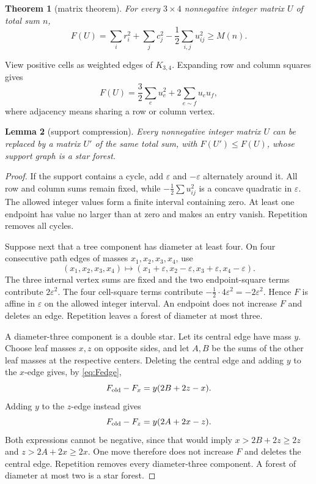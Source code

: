 \documentclass[11pt]{article}
\theoremstyle{plain}
\newtheorem{theorem}{Theorem}[section]
\newtheorem{lemma}[theorem]{Lemma}
\theoremstyle{definition}
\theoremstyle{remark}
\newcommand{\1}{\mathbf 1}
\newcommand{\eps}{\varepsilon}
\begin{document}
\begin{theorem}[matrix theorem]\label{thm:matrix}
For every $3\times4$ nonnegative integer matrix $U$ of total sum $n$,
\begin{equation}\label{eq:matrix}
 F(U)=\sum_i r_i^2+\sum_jc_j^2-\frac12\sum_{i,j}u_{ij}^2\geq M(n).
\end{equation}
\end{theorem}

View positive cells as weighted edges of $K_{3,4}$.  Expanding row and column
squares gives
\begin{equation}\label{eq:Fedge}
 F(U)=\frac32\sum_eu_e^2+2\sum_{e\sim f}u_eu_f,
\end{equation}
where adjacency means sharing a row or column vertex.

\begin{lemma}[support compression]\label{lem:compression}
Every nonnegative integer matrix $U$ can be replaced by a matrix $U'$ of the
same total sum, with $F(U')\leq F(U)$, whose support graph is a star forest.
\end{lemma}

\begin{proof}
If the support contains a cycle, add $\eps$ and $-\eps$ alternately around it.
All row and column sums remain fixed, while
$-\frac12\sum u_{ij}^2$ is a concave quadratic in $\eps$.  The allowed
integer values form a finite interval containing zero.  At least one endpoint
has value no larger than at zero and makes an entry vanish.  Repetition removes
all cycles.

Suppose next that a tree component has diameter at least four.  On four
consecutive path edges of masses $x_1,x_2,x_3,x_4$, use
\[
 (x_1,x_2,x_3,x_4)\mapsto
 (x_1+\eps,x_2-\eps,x_3+\eps,x_4-\eps).
\]
The three internal vertex sums are fixed and the two endpoint-square terms
contribute $2\eps^2$.  The four cell-square terms contribute
$-\frac12\cdot4\eps^2=-2\eps^2$.  Hence $F$ is affine in $\eps$ on the
allowed integer interval.  An endpoint does not increase $F$ and deletes an
edge.  Repetition leaves a forest of diameter at most three.

A diameter-three component is a double star.  Let its central edge have mass
$y$.  Choose leaf masses $x,z$ on opposite sides, and let $A,B$ be the sums of
the other leaf masses at the respective centers.  Deleting the central edge
and adding $y$ to the $x$-edge gives, by \eqref{eq:Fedge},
\[
 F_{\rm old}-F_x=y(2B+2z-x).
\]
Adding $y$ to the $z$-edge instead gives
\[
 F_{\rm old}-F_z=y(2A+2x-z).
\]
Both expressions cannot be negative, since that would imply
$x>2B+2z\geq2z$ and $z>2A+2x\geq2x$.  One move therefore does not increase
$F$ and deletes the central edge.  Repetition removes every diameter-three
component.  A forest of diameter at most two is a star forest.
\end{proof}
\end{document}
